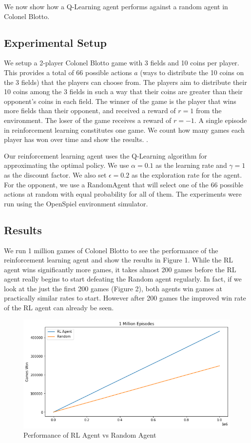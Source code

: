 \documentclass[11pt, oneside]{article}   	%
\begin{document}
We now show how a Q-Learning agent performs against a random agent in Colonel Blotto.

\subsection{Experimental Setup}

We setup a 2-player Colonel Blotto game with 3 fields and 10 coins per player. This provides a total of 66 possible actions $a$ (ways to distribute the 10 coins on the 3 fields) that the players can choose from. The players aim to distribute their 10 coins among the 3 fields in such a way that their coins are greater than their opponent's coins in each field. The winner of the game is the player that wins more fields than their opponent, and received a reward of $r=1$ from the environment. The loser of the game receives a reward of $r=-1$. A single episode in reinforcement learning constitutes one game. We count how many games each player has won over time and show the results. .

\hfill

Our reinforcement learning agent uses the Q-Learning algorithm for approximating the optimal policy. We use $\alpha=0.1$ as the learning rate and $\gamma=1$ as the discount factor. We also set $\epsilon=0.2$ as the exploration rate for the agent. For the opponent, we use a RandomAgent that will select one of the 66 possible actions at random with equal probability for all of them. The experiments were run using the OpenSpiel\cite{OpenSpiel} environment simulator.


\subsection{Results}

We run 1 million games of Colonel Blotto to see the performance of the reinforcement learning agent and show the results in Figure 1. While the RL agent wins significantly more games, it takes almost 200 games before the RL agent really begins to start defeating the Random agent regularly. In fact, if we look at the just the first 200 games (Figure 2), both agents win games at practically similar rates to start. However after 200 games the improved win rate of the RL agent can already be seen.

\begin{figure}[h]
    \centering
    \includegraphics[scale=0.5]{./images/rl_random.png}
    \caption{Performance of RL Agent vs Random Agent}
    \label{fig:mesh1}
\end{figure}
\end{document}
